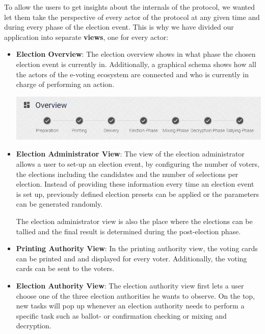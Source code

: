 To allow the users to get insights about the internals of the protocol, we wanted let them take the perspective of every actor of the protocol at any given time and during every phase of the election event. This is why we have divided our application into separate \textbf{views}, one for every actor:


\begin{itemize}
	\item \textbf{Election Overview}: The election overview shows in what phase the chosen election event is currently in. Additionally, a graphical schema shows how all the actors of the e-voting ecosystem are connected and who is currently in charge of performing an action.
	\begin{center}
\includegraphics[scale=0.65]{assets/screenshots/overview.PNG}
\label{Phases of an election-event}%
\end{center}

	\item \textbf{Election Administrator View}: The view of the election administrator allows a user to set-up an election event, by configuring the number of voters, the elections including the candidates and the number of selections per election. Instead of providing these information every time an election event is set up, previously defined election presets can be applied or the parameters can be generated randomly.
	
The election administrator view is also the place where the elections can be tallied and the final result is determined during the post-election phase.
	\item \textbf{Printing Authority View}: In the printing authority view, the voting cards can be printed and and displayed for every voter. Additionally, the voting cards can be sent to the voters.
	\item \textbf{Election Authority View}: The election authority view first lets a user choose one of the three election authorities he wants to observe. On the top, new tasks will pop up whenever an election authority needs to perform a specific task such as ballot- or confirmation checking or mixing and decryption.
	

\end{itemize}
